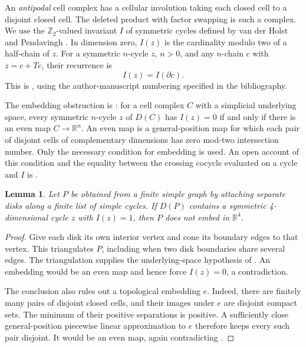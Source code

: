 \documentclass[11pt]{article}
\newtheorem{lemma}[theorem]{Lemma}
\newcommand{\R}{\mathbb R}
\begin{document}
An \emph{antipodal} cell complex has a cellular involution taking each
closed cell to a disjoint closed cell. The deleted product with factor
swapping is such a complex.
We use the $\mathbb Z_2$-valued invariant $I$ of symmetric cycles
defined by van der Holst and Pendavingh \cite{vdHP}.
In dimension zero, $I(z)$ is the cardinality modulo two of a half-chain
of $z$. For a symmetric $n$-cycle $z$, $n>0$, and any $n$-chain $c$
with $z=c+Tc$, their recurrence is
\begin{equation}\label{eq:recurrence}
I(z)=I(\partial c).
\end{equation}
This is \cite[Lemma 12]{vdHP}, using the author-manuscript numbering
specified in the bibliography.

The embedding obstruction is \cite[Theorem 18]{vdHP}: for a cell complex
$C$ with a simplicial underlying space, every symmetric $n$-cycle $z$
of $D(C)$ has $I(z)=0$ if and only if there is an even map
$C\to\R^n$. An even map is a general-position map for which each pair
of disjoint cells of complementary dimensions has zero mod-two
intersection number. Only the necessary condition for embedding is used.
An open account of this condition and the equality between the crossing
cocycle evaluated on a cycle and $I$ is \cite[Appendix B.1, pp.\ 25--26]{KT}.

\begin{lemma}\label{lem:obstruction}
Let $P$ be obtained from a finite simple graph by attaching separate
disks along a finite list of simple cycles. If $D(P)$ contains a
symmetric 4-dimensional cycle $z$ with $I(z)=1$, then $P$ does not embed in $\R^4$.
\end{lemma}
\begin{proof}
Give each disk its own interior vertex and cone its boundary edges to
that vertex. This triangulates $P$, including when two disk boundaries
share several edges. The triangulation supplies the underlying-space
hypothesis of \cite[Theorem 18]{vdHP}. An embedding would be an even map and hence
force $I(z)=0$, a contradiction.

The conclusion also rules out a topological embedding $e$.
Indeed, there are finitely many pairs of disjoint closed cells, and
their images under $e$ are disjoint compact sets. The minimum of their
positive separations is positive. A sufficiently close general-position
piecewise linear approximation to $e$ therefore keeps every such pair
disjoint. It would be an even map, again contradicting \cite[Theorem 18]{vdHP}.
\end{proof}
\end{document}
